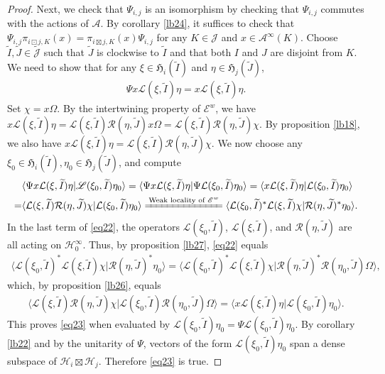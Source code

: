 \documentclass[11pt,b5paper,notitlepage]{article}
\theoremstyle{definition}
\theoremstyle{plain}
\newcommand{\fk}{\mathfrak}
\newcommand{\mc}{\mathcal}
\newcommand{\wtd}{\widetilde}
\newcommand{\bk}[1]{\langle {#1}\rangle}
\newcommand{\scr}{\mathscr}
\newcommand{\Jtd}{\widetilde{\mathcal J}}
\numberwithin{equation}{subsection}
\begin{document}
\begin{proof}
Next, we check that $\Psi_{i,j}$ is an isomorphism by checking that $\Psi_{i,j}$ commutes with the actions of $\mc A$. By corollary \ref{lb24}, it suffices to check that $\Psi_{i,j}\pi_{i\boxdot j,K}(x)=\pi_{i\boxtimes j,K}(x)\Psi_{i,j}$ for any $K\in\mc J$ and $x\in\mc A^\infty(K)$.  Choose $\wtd I,\wtd J\in\Jtd$ such that $\wtd J$ is clockwise to $\wtd I$ and that both $I$ and $J$ are disjoint from $K$. We need to show that for any $\xi\in\fk H_i(\wtd I)$ and $\eta\in\fk H_j(\wtd J)$,
\begin{align}
\Psi x\mc L(\xi,\wtd I)\eta=x\scr L(\xi,\wtd I)\eta.\label{eq23}
\end{align}
Set $\chi=x\Omega$. By the  intertwining property of $\scr E^w$, we have $x\mc L(\xi,\wtd I)\eta=\mc L(\xi,\wtd I)\mc R(\eta,\wtd J)x\Omega=\mc L(\xi,\wtd I)\mc R(\eta,\wtd J)\chi$. By proposition \ref{lb18}, we also have $x\scr L(\xi,\wtd I)\eta=\scr L(\xi,\wtd I)\scr R(\eta,\wtd J)\chi$. We now choose any $\xi_0\in\fk H_i(\wtd I),\eta_0\in\fk H_j(\wtd J)$, and compute
\begin{align}
&\bk{\Psi x\mc L(\xi,\wtd I)\eta|\scr L(\xi_0,\wtd I)\eta_0}=\bk{\Psi x\mc L(\xi,\wtd I)\eta|\Psi\mc L(\xi_0,\wtd I)\eta_0}=\bk{x\mc L(\xi,\wtd I)\eta|\mc L(\xi_0,\wtd I)\eta_0}\nonumber\\
=&\bk{\mc L(\xi,\wtd I)\mc R(\eta,\wtd J)\chi|\mc L(\xi_0,\wtd I)\eta_0}\xlongequal{\text{Weak locality of $\scr E^w$}}\bk{\mc L(\xi_0,\wtd I)^*\mc L(\xi,\wtd I)\chi|\mc R(\eta,\wtd J)^*\eta_0}.\label{eq22}
\end{align}
In the last term of \eqref{eq22}, the operators $\mc L(\xi_0,\wtd I)$, $\mc L(\xi,\wtd I)$, and $\mc R(\eta,\wtd J)$ are all acting on $\mc H_0^\infty$. Thus, by proposition \ref{lb27}, \eqref{eq22} equals
\begin{align*}
\bk{\scr L(\xi_0,\wtd I)^*\scr L(\xi,\wtd I)\chi|\scr R(\eta,\wtd J)^*\eta_0}=\bk{\scr L(\xi_0,\wtd I)^*\scr L(\xi,\wtd I)\chi|\scr R(\eta,\wtd J)^*\scr R(\eta_0,\wtd J)\Omega},
\end{align*}
which, by proposition \ref{lb26}, equals
\begin{align*}
\bk{\scr L(\xi,\wtd I)\scr R(\eta,\wtd J)\chi|\scr L(\xi_0,\wtd I)\scr R(\eta_0,\wtd J)\Omega}=\bk{x\scr L(\xi,\wtd I)\eta|\scr L(\xi_0,\wtd I)\eta_0}.
\end{align*}
This proves \eqref{eq23} when evaluated by $\scr L(\xi_0,\wtd I)\eta_0=\Psi\mc L(\xi_0,\wtd I)\eta_0$. By corollary \ref{lb22} and by the unitarity of $\Psi$, vectors of the form $\scr L(\xi_0,\wtd I)\eta_0$ span a dense subspace of $\mc H_i\boxtimes\mc H_j$. Therefore \eqref{eq23} is true.



\end{proof}
\end{document}
